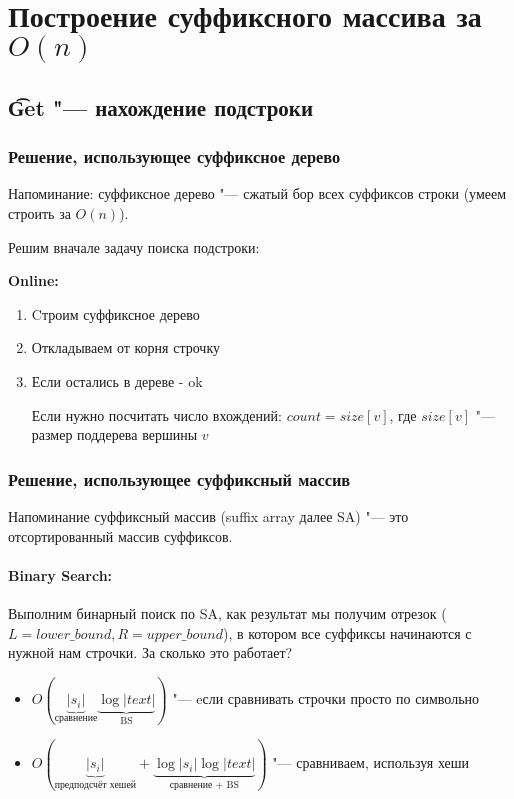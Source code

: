 \section{Построение суффиксного массива за \texorpdfstring{$O(n)$}{O(n)}}

\subsection{\t{Get} "--- нахождение подстроки}

\subsubsection{Решение, использующее суффиксное дерево}
Напоминание: суффиксное дерево "--- сжатый бор всех суффиксов строки (умеем строить за $O(n)$).

Решим вначале задачу поиска подстроки:

\textbf{Online:}
	\begin{enumerate}
	\item Cтроим суффиксное дерево
	\item Откладываем от корня строчку
	\item Если остались в дереве - ok
	
	Если нужно посчитать число вхождений: $count = size[v]$, где $size[v]$ "--- размер поддерева вершины $v$
	\end{enumerate}

\subsubsection{Решение, использующее суффиксный массив}

Напоминание суффиксный массив (suffix array далее SA) "--- это отсортированный массив суффиксов.

\paragraph{Binary Search:}

Выполним бинарный поиск по SA, как результат мы получим отрезок ($L = lower\_bound, R = upper\_bound$), в котором все суффиксы начинаются с нужной нам строчки.
За сколько это работает?
	\begin{itemize}
		\item $O(\underbrace{|s_i|}_{\text{сравнение}}\underbrace{\log |text|}_{\text{BS}})$ "--- eсли сравнивать строчки просто по символьно
		\item $O(\underbrace{|s_i|}_{\text{предподсчёт хешей}} + \underbrace{\log |s_i| \log |text|}_{\text{сравнение + BS}})$ "--- сравниваем, используя хеши
	\end{itemize}	 

